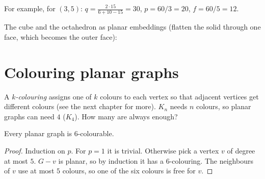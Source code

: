For example, for $(3,5)$: $q = \frac{2\cdot15}{6 + 10 - 15} = 30$, $p = 60/3 = 20$, $f = 60/5 = 12$.

The cube and the octahedron as planar embeddings (flatten the solid through one face, which
becomes the outer face):
\begin{center}
\end{center}

\section{Colouring planar graphs}

A \emph{$k$-colouring} assigns one of $k$ colours to each vertex so that adjacent vertices get
different colours (see the next chapter for more). $K_n$ needs $n$ colours, so planar graphs can
need $4$ ($K_4$). How many are always enough?

\begin{theorem}
Every planar graph is $6$-colourable.
\end{theorem}
\begin{proof}
Induction on $p$. For $p = 1$ it is trivial. Otherwise pick a vertex $v$ of degree at most $5$.
$G - v$ is planar, so by induction it has a $6$-colouring. The neighbours of $v$ use at most $5$
colours, so one of the six colours is free for $v$.
\end{proof}

